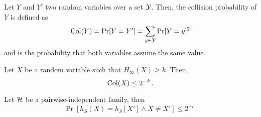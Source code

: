 \begin{definition}\label{def:col}
	Let $Y$ and $Y'$ two \iid{} random variables over a set $\mathcal{Y}$.
	Then, the collision probability of $Y$ is defined as
	\[
		\operatorname{Col}(Y) = \Pr[Y = Y'] = \sum_{y \in \mathcal{Y}} \Pr[Y = y]^2
	\]
	and is the probability that both variables assume the same value.
\end{definition}

\begin{exercise}\label{ex:leftover-hash-pre-1}
	Let $X$ be a random variable such that $H_{\infty}(X) \geq k$.
	Then,
	\begin{equation}\label{eq:leftover-hash-pre-1}
		\operatorname{Col}(X) \leq 2^{-k} \, .
	\end{equation}
\end{exercise}

\begin{exercise}\label{ex:leftover-hash-pre-2}
	Let $\mathcal{H}$ be a pairwise-independent family, then
	\begin{equation}\label{eq:leftover-hash-pre-2}
		\Pr[h_S(X) = h_S[X'] \wedge X \neq X'] \leq 2^{-l} \, .
	\end{equation}
\end{exercise}

